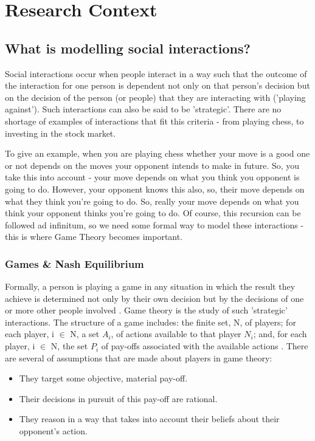 \documentclass[12pt]{article}
\newcommand*{\np}{\par\noindent\newline}
\begin{document}
\section{Research Context}
\subsection{What is modelling social interactions?}
Social interactions occur when people interact in a way such that the outcome
of the interaction for one person is dependent not  only on that person's
decision but on the decision of the person (or people) that they are interacting with ('playing against'). Such interactions can also be said to be
'strategic'. There are no shortage of examples of interactions that fit this
criteria - from playing chess, to investing in the stock market.
\np To give an example, when you are playing chess whether your move is a good
one or not depends on the moves your opponent intends to make in future. So,
you take this into account - your move depends on what you think you opponent
is going to do. However, your opponent knows this also, so, their move depends
on what they think you're going to do. So, really your move depends on what you
think your opponent thinks you're going to do. Of course, this recursion can be
followed ad infinitum, so we need some formal way to model these interactions
- this is where Game Theory becomes important.
\subsubsection{Games \& Nash Equilibrium}
Formally, a person is playing a game in any situation in which the result they
achieve is determined not only by their own decision but by the decisions of
one or more other people involved \cite{angner_course_2012}. Game theory is the
study of such 'strategic' interactions.
The structure of a game includes: the finite set, N, of players; for each
player, i $\in$ N, a set $A_i$, of actions available to that player
$N_i$; and, for each player, i $\in$ N, the set $P_i$ of
pay-offs associated with the available actions \cite{osborne_course_1994}.
There are several of assumptions that are made about players in game theory:
\begin{itemize}
    \item They target some objective, material pay-off.
    \item Their decisions in pursuit of this pay-off are rational.
    \item They reason in a way that takes into account their beliefs about their opponent's action. 
\end{itemize}
\end{document}

